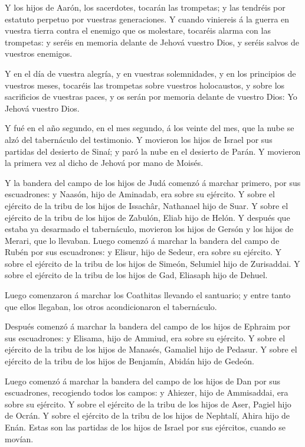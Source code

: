  Y los hijos de Aarón, los sacerdotes, tocarán las
trompetas; y las tendréis por estatuto perpetuo por vuestras
generaciones.  Y cuando viniereis á la guerra en vuestra
tierra contra el enemigo que os molestare, tocaréis alarma con las
trompetas: y seréis en memoria delante de Jehová vuestro Dios, y seréis
salvos de vuestros enemigos.

 Y en el día de vuestra alegría, y en vuestras
solemnidades, y en los principios de vuestros meses, tocaréis las
trompetas sobre vuestros holocaustos, y sobre los sacrificios de
vuestras paces, y os serán por memoria delante de vuestro Dios: Yo
Jehová vuestro Dios.

 Y fué en el año segundo, en el mes segundo, á los veinte
del mes, que la nube se alzó del tabernáculo del testimonio.
 Y movieron los hijos de Israel por sus partidas del
desierto de Sinaí; y paró la nube en el desierto de Parán. 
Y movieron la primera vez al dicho de Jehová por mano de Moisés.

 Y la bandera del campo de los hijos de Judá comenzó á
marchar primero, por sus escuadrones: y Naasón, hijo de Aminadab, era
sobre su ejército.  Y sobre el ejército de la tribu de los
hijos de Issachâr, Nathanael hijo de Suar.  Y sobre el
ejército de la tribu de los hijos de Zabulón, Eliab hijo de Helón.
 Y después que estaba ya desarmado el tabernáculo, movieron
los hijos de Gersón y los hijos de Merari, que lo llevaban.
 Luego comenzó á marchar la bandera del campo de Rubén por
sus escuadrones: y Elisur, hijo de Sedeur, era sobre su ejército.
 Y sobre el ejército de la tribu de los hijos de Simeón,
Selumiel hijo de Zurisaddai.  Y sobre el ejército de la
tribu de los hijos de Gad, Eliasaph hijo de Dehuel.

 Luego comenzaron á marchar los Coathitas llevando el
santuario; y entre tanto que ellos llegaban, los otros acondicionaron el
tabernáculo.

 Después comenzó á marchar la bandera del campo de los
hijos de Ephraim por sus escuadrones: y Elisama, hijo de Ammiud, era
sobre su ejército.  Y sobre el ejército de la tribu de los
hijos de Manasés, Gamaliel hijo de Pedasur.  Y sobre el
ejército de la tribu de los hijos de Benjamín, Abidán hijo de Gedeón.

 Luego comenzó á marchar la bandera del campo de los hijos
de Dan por sus escuadrones, recogiendo todos los campos: y Ahiezer, hijo
de Ammisaddai, era sobre su ejército.  Y sobre el ejército
de la tribu de los hijos de Aser, Pagiel hijo de Ocrán.  Y
sobre el ejército de la tribu de los hijos de Nephtalí, Ahira hijo de
Enán.  Estas son las partidas de los hijos de Israel por
sus ejércitos, cuando se movían.

